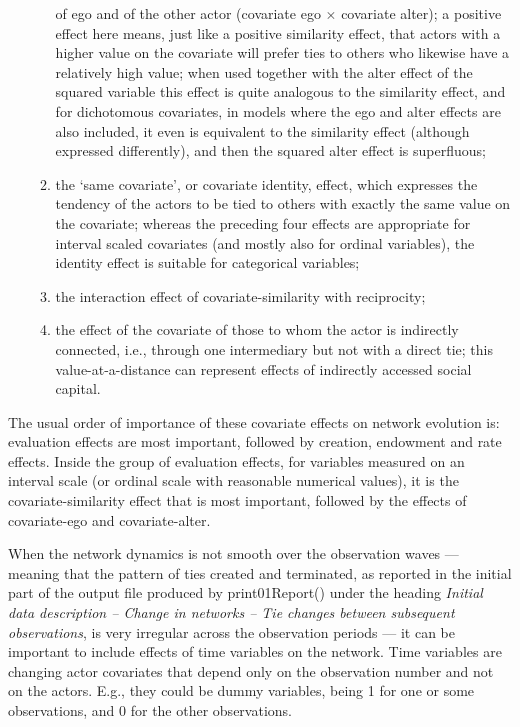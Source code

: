 \documentclass[a4paper,fleqn,11pt]{article}
\newcommand{\+}{\, + \,}
\newcommand{\sfn}[1]{\textsf{#1}}
\begin{document}
\begin{itemize}
\begin{enumerate}
      of ego and of the other actor (covariate ego $\times$ covariate alter);
      a positive effect here means, just like a positive similarity effect,
      that actors with a higher value on the covariate
      will prefer ties to others who likewise have a relatively high
      value;
      when used together with the alter effect of the squared variable
      this effect is quite analogous to the similarity effect,
      and for dichotomous covariates, in models where the ego and
      alter effects are also included, it even is equivalent
      to the similarity effect (although expressed differently),
      and then the squared alter effect is superfluous;
\item the `same covariate', or covariate identity, effect, which expresses the tendency of the
      actors to be tied to others with exactly the same value on the covariate;
      whereas the preceding four effects are appropriate for interval scaled
      covariates (and mostly also for ordinal variables),
      the identity effect is suitable for categorical variables;
\item the interaction effect of covariate-similarity with reciprocity;
\item the effect of the covariate of those to whom the actor is
      indirectly connected, i.e., through one intermediary but not
      with a direct tie; this value-at-a-distance can represent
      effects of indirectly accessed social capital.
\end{enumerate}
\end{itemize}
The usual order of importance of these covariate effects on
network evolution is: evaluation effects are most important, followed
by creation, endowment and rate effects. Inside the group of evaluation
effects, for variables measured on an interval scale
(or ordinal scale with reasonable numerical values),
it is the covariate-similarity effect that is most
important, followed by the effects of covariate-ego and
covariate-alter.

When the network dynamics is not smooth over the observation waves --- meaning that
the pattern of ties created and terminated, as reported in the initial part of the
output file produced by \sfn{print01Report()}
under the heading \emph{Initial data description -- Change in networks --
Tie changes between subsequent observations},
is very irregular across the observation periods --- it can be important to include
effects of time variables on the network.
Time variables are changing actor covariates that depend only on the
observation number and not on the actors. E.g., they could be dummy variables,
being 1 for one or some observations, and 0 for the other observations.
\end{document}
